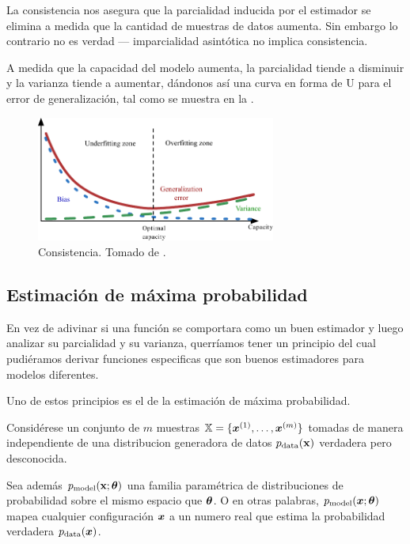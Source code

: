 La consistencia nos asegura que la parcialidad inducida por el estimador se elimina a medida que la cantidad de muestras de datos aumenta. Sin embargo lo contrario no es verdad --- imparcialidad asintótica no implica consistencia.

A medida que la capacidad del modelo aumenta, la parcialidad tiende a disminuir y la varianza tiende a aumentar, dándonos así una curva en forma de U para el error de generalización, tal como se muestra en la .

\begin{figure}[H]
  \centering
  \includegraphics[width=0.7\textwidth]{Figures/consistency.pdf}
  \decoRule
  \caption[Consistencia]{Consistencia. Tomado de \cite{deeplearning}.}
  \label{fig:consistency}
\end{figure}


\subsection{Estimación de máxima probabilidad}
En vez de adivinar si una función se comportara como un buen estimador y luego analizar su parcialidad y su varianza, querríamos tener un principio del cual pudiéramos derivar funciones especificas que son buenos estimadores para modelos diferentes.

Uno de estos principios es el de la estimación de máxima probabilidad.

Considérese un conjunto de $m$ muestras ${\mathbb{X}} = \{ {\bm{x}}^{(1)}, \ldots, {\bm{x}}^{(m)} \}$ tomadas de manera independiente de una distribucion generadora de datos $p_{\rm{data}}({\mathbf{x}})$ verdadera pero desconocida.

Sea además $p_{\rm{model}}({\mathbf{x}}; {\bm{\theta}})$ una familia paramétrica de distribuciones de probabilidad sobre el mismo espacio que ${\bm{\theta}}$. O en otras palabras, $p_{\rm{model}}({\bm{x}}; {\bm{\theta}})$ mapea cualquier configuración ${\bm{x}}$ a un numero real que estima la probabilidad verdadera $p_{\rm{data}}({\bm{x}})$.

